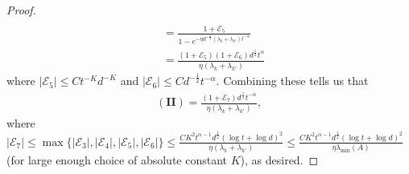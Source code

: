 \documentclass[11pt, reqno,english]{amsart}
\begin{document}
\begin{proof}
\begin{align*}
\\
&= \frac{1 + \mathcal E_5}{1 - e^{-\eta d^{-\frac{1}{2}}(\lambda_k + \lambda_{k'})t^{-\alpha}}}
\\
&= \frac{(1 + \mathcal E_5)(1 + \mathcal E_6)d^{\frac{1}{2}}t^{\alpha}}{\eta (\lambda_k + \lambda_{k'})}
\end{align*}
where $|\mathcal E_5| \leq Ct^{-K}d^{-K}$ and $|\mathcal E_6| \leq C d^{-\frac{1}{2}}t^{-\alpha}$. Combining these tells us that
\begin{align*}
(\mathbf{II}) = \frac{(1 + \mathcal E_7)d^{\frac{1}{2}}t^{-\alpha}}{\eta (\lambda_k + \lambda_{k'})}, 
\end{align*}
where $|\mathcal E_7| \leq \max\{|\mathcal E_3|, |\mathcal E_4|, |\mathcal E_5|, |\mathcal E_6|\} \leq \frac{CK^2 t^{\alpha - 1}d^{\frac{1}{2}}(\log t + \log d)^2}{\eta (\lambda_k + \lambda_{k'})} \leq \frac{CK^2 t^{\alpha - 1}d^{\frac{1}{2}}(\log t + \log d)^2}{\eta \lambda_{\min}(A)}$ (for large enough choice of absolute constant $K$), as desired. 
\end{proof}
\end{document}
